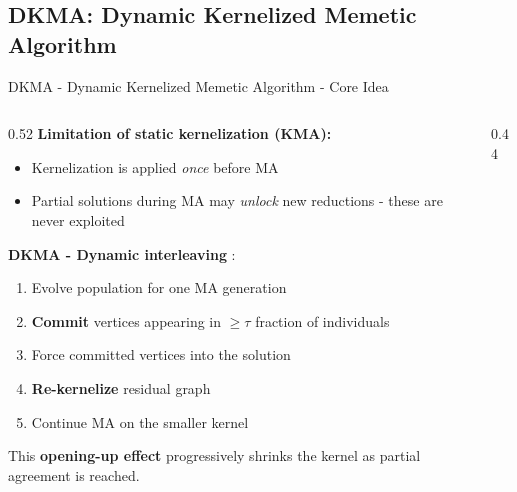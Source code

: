 \documentclass[aspectratio=169]{beamer}
\newcommand{\highlight}[1]{\textcolor{midblue}{\textbf{#1}}}
\begin{document}
\subsection{DKMA: Dynamic Kernelized Memetic Algorithm}

\begin{frame}{DKMA - Dynamic Kernelized Memetic Algorithm - Core Idea}
	\begin{columns}[T]
		\begin{column}{0.52\textwidth}
			\textbf{Limitation of static kernelization (KMA):}
			\begin{itemize}
				\item Kernelization is applied \emph{once} before MA
				\item Partial solutions during MA may \emph{unlock} new reductions -
				      these are never exploited
			\end{itemize}
			\vspace{4pt}
			\textbf{DKMA - Dynamic interleaving} \cite{pace2022,esa2022}:
			\begin{enumerate}\setlength\itemsep{2pt}
				\item Evolve population for one MA generation
				\item \highlight{Commit} vertices appearing in $\ge \tau$ fraction of individuals
				\item Force committed vertices into the solution
				\item \highlight{Re-kernelize} residual graph
				\item Continue MA on the smaller kernel
			\end{enumerate}
			\vspace{4pt}
			This \textbf{opening-up effect} progressively shrinks the kernel
			as partial agreement is reached.
		\end{column}
		\begin{column}{0.44\textwidth}
\end{column}
\end{columns}
\end{frame}
\end{document}
